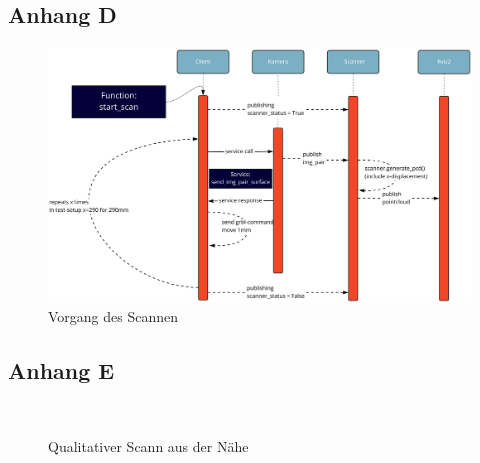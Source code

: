 \documentclass[	12pt,
				a4paper,
				bibliography=totoc,
				listof=totoc,
				index=totoc,
				twoside,
				headsepline,
				footsepline,
				ngerman]{scrartcl}
\begin{document}
\begin{appendix}
		\subsection{Anhang D}\label{anhang-d}
			\begin{figure}[h!]
				\centering
				\includegraphics[width=1\linewidth]{img/anhang/vorgang_scanablauf.jpg}
				\caption{Vorgang des Scannen}
				\label{fig:vorgang_scan}
			\end{figure}
		\newpage
		\subsection{Anhang E}\label{anhang-e}
			\begin{figure}[h]
				\centering
				 \\
				\caption{Qualitativer Scann aus der Nähe}
				\label{fig:scan_lines}
			\end{figure}
		\newpage

\end{appendix}
\end{document}
